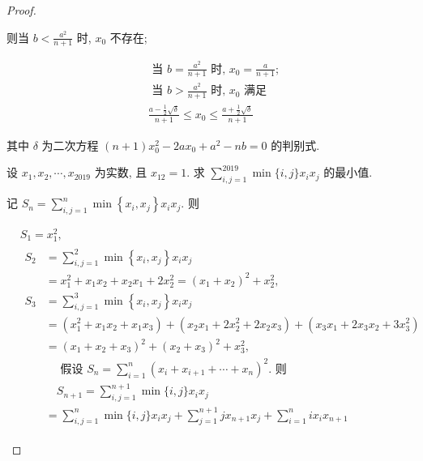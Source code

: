 \begin{proof}
\begin{example}
\begin{note}
	则当 $b<\frac{a^{2}}{n+1}$ 时, $x_{0}$ 不存在;
	
	$$
	\begin{aligned}
	& \text { 当 } b=\frac{a^{2}}{n+1} \text { 时, } x_{0}=\frac{a}{n+1} \text {; } \\
	& \text { 当 } b>\frac{a^{2}}{n+1} \text { 时, } x_{0} \text { 满足 } \\
	& \frac{a-\frac{1}{2} \sqrt{\delta}}{n+1} \leqslant x_{0} \leqslant \frac{a+\frac{1}{2} \sqrt{\delta}}{n+1}
	\end{aligned}
	$$
	
	其中 $\delta$ 为二次方程 $(n+1) x_{0}^{2}-2 a x_{0}+a^{2}-n b=0$ 的判别式.
\end{note}

\begin{example}
	设 $x_{1}, x_{2}, \cdots, x_{2019}$ 为实数, 且 $x_{12}=1$. 求 $\sum_{i, j=1}^{2019} \min \{i, j\} x_{i} x_{j}$ 的最小值.
\end{example}
\begin{solution}
	记 $S_{n}=\sum_{i, j=1}^{n} \min \left\{x_{i}, x_{j}\right\} x_{i} x_{j}$. 则
	
	$$
	\begin{aligned}
	& S_{1}=x_{1}^{2} \text {, } \\
	& \begin{aligned}
	S_{2} & =\sum_{i, j=1}^{2} \min \left\{x_{i}, x_{j}\right\} x_{i} x_{j} \\
	& =x_{1}^{2}+x_{1} x_{2}+x_{2} x_{1}+2 x_{2}^{2}=\left(x_{1}+x_{2}\right)^{2}+x_{2}^{2}, \\
	S_{3} & =\sum_{i, j=1}^{3} \min \left\{x_{i}, x_{j}\right\} x_{i} x_{j} \\
	& =\left(x_{1}^{2}+x_{1} x_{2}+x_{1} x_{3}\right)+\left(x_{2} x_{1}+2 x_{2}^{2}+2 x_{2} x_{3}\right)+\left(x_{3} x_{1}+2 x_{3} x_{2}+3 x_{3}^{2}\right) \\
	& =\left(x_{1}+x_{2}+x_{3}\right)^{2}+\left(x_{2}+x_{3}\right)^{2}+x_{3}^{2}, \\
	& \quad \text { 假设 } S_{n}=\sum_{i=1}^{n}\left(x_{i}+x_{i+1}+\cdots+x_{n}\right)^{2} \text {. 则 } \\
	& \quad S_{n+1}=\sum_{i, j=1}^{n+1} \min \{i, j\} x_{i} x_{j} \\
	& =\sum_{i, j=1}^{n} \min \{i, j\} x_{i} x_{j}+\sum_{j=1}^{n+1} j x_{n+1} x_{j}+\sum_{i=1}^{n} i x_{i} x_{n+1}
	\end{aligned}
	\end{aligned}
	$$
	

\end{solution}
\end{example}
\end{proof}
